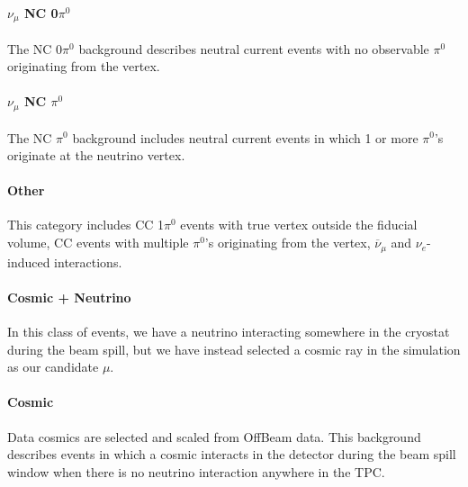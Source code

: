 \paragraph{  $\nu_\mu$ NC 0$\pi^0$}
The NC 0$\pi^0$ background describes neutral current events with no observable $\pi^0$ originating from the vertex.  


\paragraph{  $\nu_\mu$ NC $\pi^0$}
The NC $\pi^0$ background includes neutral current events in which 1 or more $\pi^0$'s originate at the neutrino vertex.  


\paragraph{ Other}
This category includes CC 1$\pi^0$ events with true vertex outside the fiducial volume, CC events with multiple $\pi^0$'s originating from the vertex, $\overline{\nu}_\mu$ and $\nu_e$-induced interactions. 

\paragraph{ Cosmic + Neutrino }
In this class of events, we have a neutrino interacting somewhere in the cryostat during the beam spill, but we have instead selected a cosmic ray in the simulation as our candidate $\mu$. 

\paragraph{Cosmic }
Data cosmics are selected and scaled from OffBeam data.  This background describes events in which a cosmic interacts in the detector during the beam spill window when there is no neutrino interaction anywhere in the TPC.  

